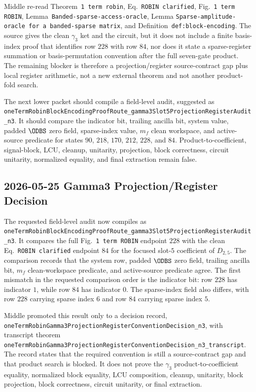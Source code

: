 Middle re-read Theorem~\texttt{1 term robin}, Eq.~\texttt{ROBIN clarified},
Fig.~\texttt{1 term ROBIN}, Lemma~\texttt{Banded-sparse-access-oracle}, Lemma
\texttt{Sparse-amplitude-oracle for a banded-sparse matrix}, and
Definition~\texttt{def:block-encoding}.  The source gives the clean
\(\gamma_3\) ket and the circuit, but it does not include a finite
basis-index proof that identifies row \(228\) with row \(84\), nor does it
state a sparse-register summation or basis-permutation convention after the
full seven-gate product.  The remaining blocker is therefore a
projection/register source-contract gap plus local register arithmetic, not a
new external theorem and not another product-fold search.

The next lower packet should compile a field-level audit, suggested as
\texttt{oneTermRobinBlockEncodingProofRoute\_gamma3Slot5ProjectionRegisterAudit\_n3}.
It should compare the indicator bit, trailing ancilla bit, system value,
padded \(\ODBS\) zero field, sparse-index value, \(m_f\) clean workspace, and
active-source predicate for states \(90\), \(218\), \(170\), \(212\), \(228\),
and \(84\).  Product-to-coefficient, signal-block, LCU, cleanup, unitarity,
projection, block correctness, circuit unitarity, normalized equality, and
final extraction remain false.

\subsection{2026-05-25 Gamma3 Projection/Register Decision}

The requested field-level audit now compiles as
\texttt{oneTermRobinBlockEncodingProofRoute\_gamma3Slot5ProjectionRegisterAudit\_n3}.
It compares the full Fig.~\texttt{1 term ROBIN} endpoint \(228\) with the
clean Eq.~\texttt{ROBIN clarified} endpoint \(84\) for the focused
slot-\(5\) coefficient of \(D_{2,5}\).  The comparison records that the
system row, padded \(\ODBS\) zero field, trailing ancilla bit, \(m_f\)
clean-workspace predicate, and active-source predicate agree.  The first
mismatch in the requested comparison order is the indicator bit:
row \(228\) has indicator \(1\), while row \(84\) has indicator \(0\).
The sparse-index field also differs, with row \(228\) carrying sparse index
\(6\) and row \(84\) carrying sparse index \(5\).

Middle promoted this result only to a decision record,
\texttt{oneTermRobinGamma3ProjectionRegisterConventionDecision\_n3}, with
transcript theorem
\texttt{oneTermRobinGamma3ProjectionRegisterConventionDecision\_n3\_transcript}.
The record states that the required convention is still a source-contract gap
and that product search is blocked.  It does not prove the
\(\gamma_3\) product-to-coefficient equality, normalized block equality, LCU
composition, cleanup, unitarity, block projection, block correctness, circuit
unitarity, or final extraction.

